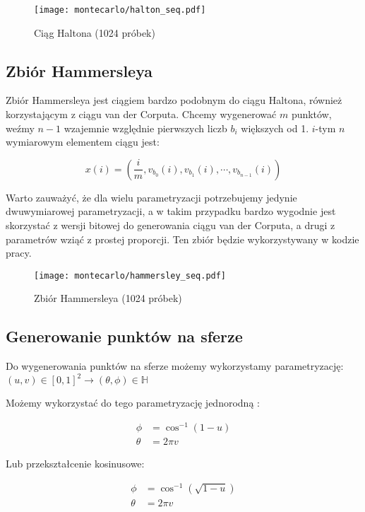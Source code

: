 \documentclass[../main.tex]{subfiles}
\begin{document}
\begin{figure}[h]
  \centering
  \texttt{[image: montecarlo/halton\_seq.pdf]}
  \caption{Ciąg Haltona (1024 próbek)}
  \label{fig:HaltonSamples}
\end{figure}

\subsection{Zbiór Hammersleya}

Zbiór Hammersleya jest ciągiem bardzo podobnym do ciągu Haltona, również
korzystającym z ciągu van der Corputa. Chcemy wygenerować $m$ punktów, weźmy
$n-1$ wzajemnie względnie pierwszych liczb $b_i$ większych od 1. $i$-tym $n$
wymiarowym elementem ciągu jest:

\[
  x(i) = \left(
    \frac{i}{m}, v_{b_0}(i), v_{b_1}(i), \cdots, v_{b_{n-1}}(i)
  \right)
\]

Warto zauważyć, że dla wielu parametryzacji potrzebujemy jedynie dwuwymiarowej
parametryzacji, a w takim przypadku bardzo wygodnie jest skorzystać z wersji
bitowej do generowania ciągu van der Corputa, a drugi z parametrów wziąć z
prostej proporcji. Ten zbiór będzie wykorzystywany w kodzie pracy.

\begin{figure}[h]
  \centering
  \texttt{[image: montecarlo/hammersley\_seq.pdf]}
  \caption{Zbiór Hammersleya (1024 próbek)}
  \label{fig:HammersleySamples}
\end{figure}

\subsection{Generowanie punktów na sferze}

Do wygenerowania punktów na sferze możemy wykorzystamy parametryzację:
  $(u,v) \in [0,1]^2 \rightarrow (\theta, \phi) \in \mathbb{H}$

Możemy wykorzystać do tego parametryzację jednorodną \cite{dammertz_2012}:

\begin{align*}
	\phi &= \cos^{-1}(1-u) \\
	\theta &= 2 \pi v
\end{align*}

Lub przekształcenie kosinusowe:

\begin{align*}
  \phi &= \cos^{-1}(\sqrt{1-u}) \\
  \theta &= 2 \pi v
\end{align*}
\end{document}
